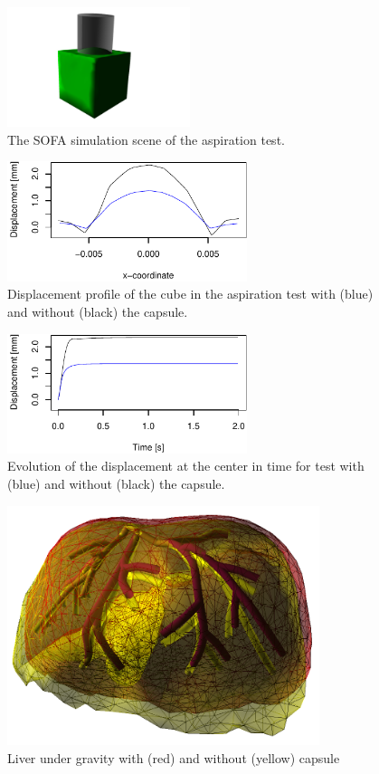 \newpage


\begin{figure}[t]
  \centering
  \includegraphics[height=3.5cm]{aspiration.jpg}
  \caption{\label{fig-aspiration1} The SOFA simulation scene of the aspiration test.}
\end{figure}

\begin{figure}[t]
  \centering
  \includegraphics[width=7cm]{aspiration.pdf}
  \caption{\label{fig-aspiration2} Displacement profile of the cube in the
  aspiration test with (blue) and without (black) the capsule.}
\end{figure}

\begin{figure}
  \centering
  \includegraphics[height=3.5cm]{displacement.pdf}
  \caption{\label{fig-aspiration3} Evolution of the displacement at the center
  in time for test with (blue) and without (black) the capsule.}
\end{figure}

\begin{figure}[b]
  \centering
  \includegraphics[height=7cm]{gravity2.png}
  \caption{\label{f:gravity} Liver under gravity with (red) and without (yellow) capsule}
\end{figure}
